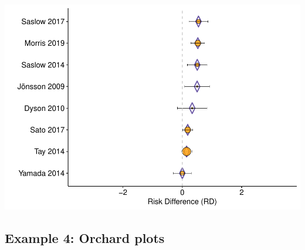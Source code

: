 \documentclass[
]{book}
\begin{document}
\includegraphics{_main_files/figure-latex/unnamed-chunk-30-1.pdf}

\subsection{Example 4: Orchard plots}\label{example-4-orchard-plots}
\end{document}
